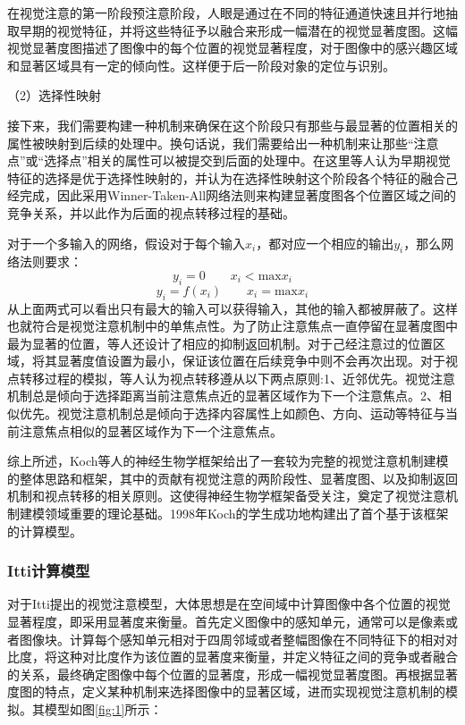 \documentclass[a4paper,10pt]{article}\large
\begin{document}
在视觉注意的第一阶段预注意阶段，人眼是通过在不同的特征通道快速且并行地抽取早期的视觉特征，并将这些特征予以融合来形成一幅潜在的视觉显著度图。这幅视觉显著度图描述了图像中的每个位置的视觉显著程度，对于图像中的感兴趣区域和显著区域具有一定的倾向性。这样便于后一阶段对象的定位与识别。


（2）选择性映射

接下来，我们需要构建一种机制来确保在这个阶段只有那些与最显著的位置相关的属性被映射到后续的处理中。换句话说，我们需要给出一种机制来让那些“注意点”或“选择点”相关的属性可以被提交到后面的处理中。在这里等人认为早期视觉特征的选择是优于选择性映射的，并认为在选择性映射这个阶段各个特征的融合己经完成，因此采用Winner-Taken-All网络法则来构建显著度图各个位置区域之间的竞争关系，并以此作为后面的视点转移过程的基础。

对于一个多输入的网络，假设对于每个输入$x_{i}$，都对应一个相应的输出$y_{i}$，那么网络法则要求：
\begin{equation}
y_{i}=0\qquad x_{i} < \textrm{max} x_{i}
\end{equation}
\begin{equation}
y_{i}=f(x_{i})\qquad x_{i} = \textrm{max} x_{i}
\end{equation}
从上面两式可以看出只有最大的输入可以获得输入，其他的输入都被屏蔽了。这样也就符合是视觉注意机制中的单焦点性。为了防止注意焦点一直停留在显著度图中最为显著的位置，等人还设计了相应的抑制返回机制。对于己经注意过的位置区域，将其显著度值设置为最小，保证该位置在后续竞争中则不会再次出现。对于视点转移过程的模拟，等人认为视点转移遵从以下两点原则:1、近邻优先。视觉注意机制总是倾向于选择距离当前注意焦点近的显著区域作为下一个注意焦点。2、相似优先。视觉注意机制总是倾向于选择内容属性上如颜色、方向、运动等特征与当前注意焦点相似的显著区域作为下一个注意焦点。


综上所述，Koch等人的神经生物学框架给出了一套较为完整的视觉注意机制建模的整体思路和框架，其中的贡献有视觉注意的两阶段性、显著度图、以及抑制返回机制和视点转移的相关原则。这使得神经生物学框架备受关注，奠定了视觉注意机制建模领域重要的理论基础。1998年Koch的学生成功地构建出了首个基于该框架的计算模型。


\subsubsection{Itti计算模型}

对于Itti提出的视觉注意模型\cite{1:article}，大体思想是在空间域中计算图像中各个位置的视觉显著程度，即采用显著度来衡量。首先定义图像中的感知单元，通常可以是像素或者图像块。计算每个感知单元相对于四周邻域或者整幅图像在不同特征下的相对对比度，将这种对比度作为该位置的显著度来衡量，并定义特征之间的竞争或者融合的关系，最终确定图像中每个位置的显著度，形成一幅视觉显著度图。再根据显著度图的特点，定义某种机制来选择图像中的显著区域，进而实现视觉注意机制的模拟。其模型如图\ref{fig:1}所示：
\end{document}
